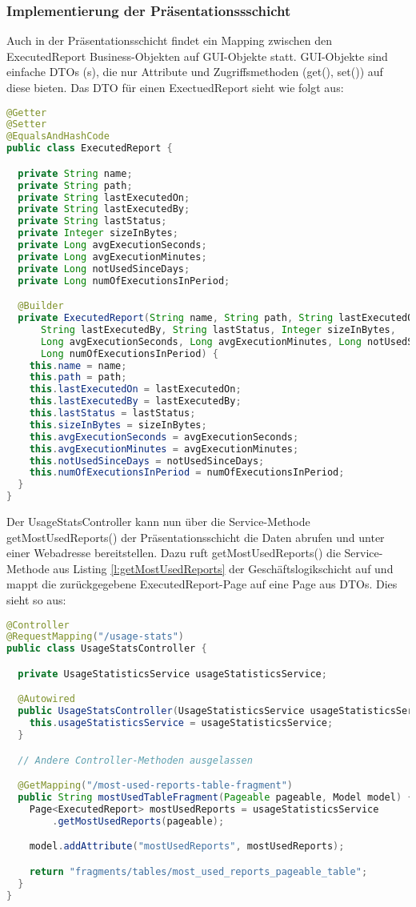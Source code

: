 \subsubsection{Implementierung der Präsentationssschicht}
\label{sec:ImplementierungPraesentationsschicht}
Auch in der Präsentationsschicht findet ein Mapping zwischen den ExecutedReport Business-Objekten auf \ac{GUI}-Objekte statt. \ac{GUI}-Objekte sind einfache \acs{DTO}s (s), die nur Attribute und Zugriffsmethoden (get(), set()) auf diese bieten. Das \ac{DTO} für einen ExectuedReport sieht wie folgt aus:
\begin{lstlisting}[language=Java,caption={ExecutedReport-DTO}]
@Getter
@Setter
@EqualsAndHashCode
public class ExecutedReport {

  private String name;
  private String path;
  private String lastExecutedOn;
  private String lastExecutedBy;
  private String lastStatus;
  private Integer sizeInBytes;
  private Long avgExecutionSeconds;
  private Long avgExecutionMinutes;
  private Long notUsedSinceDays;
  private Long numOfExecutionsInPeriod;

  @Builder
  private ExecutedReport(String name, String path, String lastExecutedOn,
      String lastExecutedBy, String lastStatus, Integer sizeInBytes,
      Long avgExecutionSeconds, Long avgExecutionMinutes, Long notUsedSinceDays,
      Long numOfExecutionsInPeriod) {
    this.name = name;
    this.path = path;
    this.lastExecutedOn = lastExecutedOn;
    this.lastExecutedBy = lastExecutedBy;
    this.lastStatus = lastStatus;
    this.sizeInBytes = sizeInBytes;
    this.avgExecutionSeconds = avgExecutionSeconds;
    this.avgExecutionMinutes = avgExecutionMinutes;
    this.notUsedSinceDays = notUsedSinceDays;
    this.numOfExecutionsInPeriod = numOfExecutionsInPeriod;
  }
}
\end{lstlisting}
Der UsageStatsController kann nun über die Service-Methode getMostUsedReports() der Präsentationsschicht die Daten abrufen und unter einer Webadresse bereitstellen. Dazu ruft getMostUsedReports() die Service-Methode aus Listing \ref{l:getMostUsedReports} der Geschäftslogikschicht auf und mappt die zurückgegebene ExecutedReport-Page auf eine Page aus \ac{DTO}s. Dies sieht so aus:
\begin{lstlisting}[language=Java,caption={UsageStatsController}]
@Controller
@RequestMapping("/usage-stats")
public class UsageStatsController {

  private UsageStatisticsService usageStatisticsService;

  @Autowired
  public UsageStatsController(UsageStatisticsService usageStatisticsService) {
    this.usageStatisticsService = usageStatisticsService;
  }

  // Andere Controller-Methoden ausgelassen

  @GetMapping("/most-used-reports-table-fragment")
  public String mostUsedTableFragment(Pageable pageable, Model model) {
    Page<ExecutedReport> mostUsedReports = usageStatisticsService
        .getMostUsedReports(pageable);

    model.addAttribute("mostUsedReports", mostUsedReports);

    return "fragments/tables/most_used_reports_pageable_table";
  }
}
\end{lstlisting}
